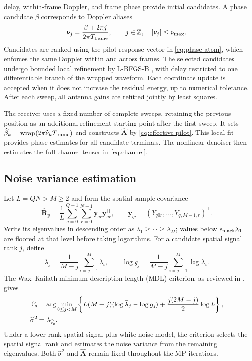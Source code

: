 delay, within-frame Doppler, and frame phase provide initial candidates.
A phase candidate $\beta$ corresponds to Doppler aliases
\begin{equation}
 \nu_j=\frac{\beta+2\pi j}{2\pi T_{\rm frame}},\qquad
 j\in\mathbb Z,\quad |\nu_j|\leq\nu_{\max}.
 \label{eq:phase-aliases}
\end{equation}
Candidates are ranked using the pilot response vector in
\eqref{eq:phase-atom}, which enforces the same Doppler within and across
frames. The selected candidates undergo bounded local refinement by
L-BFGS-B \cite{zhu1997}, with delay restricted to one differentiable
branch of the wrapped waveform. Each coordinate update is accepted
when it does not increase the residual energy, up to numerical tolerance.
After each sweep, all antenna gains are refitted jointly by least squares.

The receiver uses a fixed number of complete sweeps, retaining the previous
position as an additional refinement starting point after the first sweep.
It sets $\widehat\beta_k=\operatorname{wrap}
(2\pi\widehat\nu_kT_{\rm frame})$ and constructs
$\widehat{\mathbf A}$ by \eqref{eq:effective-pilot}.
This local fit provides phase estimates for all candidate terminals.
The nonlinear denoiser then estimates the full channel tensor in
\eqref{eq:channel}.

\subsection{Noise variance estimation}
Let $L=QN>M\geq2$ and form the spatial sample covariance
\begin{equation}
 \widehat{\mathbf R}_y=\frac1L\sum_{q=0}^{Q-1}\sum_{r=0}^{N-1}
 \mathbf y_{qr}\mathbf y_{qr}^{\mathsf H},\qquad
 \mathbf y_{qr}=(Y_{q0r},\ldots,Y_{q,M-1,r})^{\mathsf T}.
 \label{eq:spatial-noise-covariance}
\end{equation}
Write its eigenvalues in descending order as
$\lambda_1\geq\cdots\geq\lambda_M$; values below
$\epsilon_{\rm mach}\lambda_1$ are floored at that level before
taking logarithms. For a candidate spatial signal rank $j$, define
\begin{equation}
 \bar\lambda_j=\frac1{M-j}\sum_{i=j+1}^M\lambda_i,\qquad
 \log g_j=\frac1{M-j}\sum_{i=j+1}^M\log\lambda_i.
 \label{eq:noise-tail-statistics}
\end{equation}
The Wax--Kailath minimum description length (MDL) criterion, as reviewed
in \cite[Sec.~II-A, eqs.~(5)--(7)]{nadakuditi2008}, gives
\begin{equation}
 \begin{aligned}
 \widehat r_{\rm s}
 &=\arg\min_{0\leq j<M}\left\{
 L(M-j)(\log\bar\lambda_j-\log g_j)
 +\frac{j(2M-j)}2\log L\right\},\\
 \widehat\sigma^2&=\bar\lambda_{\widehat r_{\rm s}}.
 \end{aligned}
 \label{eq:noise-mdl}
\end{equation}
Under a lower-rank spatial signal plus white-noise model, the criterion
selects the spatial signal rank and estimates the noise variance from
the remaining eigenvalues. Both $\widehat\sigma^2$ and
$\widehat{\mathbf A}$ remain fixed throughout the MP iterations.


